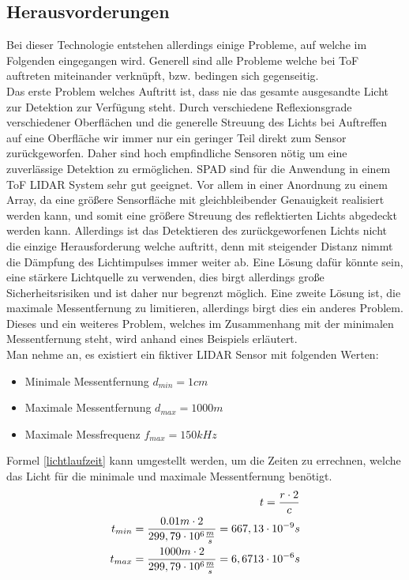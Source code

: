 \subsection{Herausvorderungen}\label{subsec:tof_herausvorderungen}
Bei dieser Technologie entstehen allerdings einige Probleme, auf welche im Folgenden eingegangen wird. Generell sind alle Probleme welche bei \ac{ToF} auftreten miteinander verknüpft, bzw. bedingen sich gegenseitig. \\
Das erste Problem welches Auftritt ist, dass nie das gesamte ausgesandte Licht zur Detektion zur Verfügung steht. Durch verschiedene Reflexionsgrade verschiedener Oberflächen und die generelle Streuung des Lichts bei Auftreffen auf eine Oberfläche wir immer nur ein geringer Teil direkt zum Sensor zurückgeworfen. Daher sind hoch empfindliche Sensoren nötig um eine zuverlässige Detektion zu ermöglichen.
\ac{SPAD} sind für die Anwendung in einem \ac{ToF} \ac{LIDAR} System sehr gut geeignet. Vor allem in einer Anordnung zu einem Array, da eine größere Sensorfläche mit gleichbleibender Genauigkeit realisiert werden kann, und somit eine größere Streuung des reflektierten Lichts abgedeckt werden kann. Allerdings ist das Detektieren des zurückgeworfenen Lichts nicht die einzige Herausforderung welche auftritt, denn mit steigender Distanz nimmt die Dämpfung des Lichtimpulses immer weiter ab. 
Eine Lösung dafür könnte sein, eine stärkere Lichtquelle zu verwenden, dies birgt allerdings große Sicherheitsrisiken und ist daher nur begrenzt möglich. Eine zweite Lösung ist, die maximale Messentfernung zu limitieren, allerdings birgt dies ein anderes Problem. Dieses und ein weiteres Problem, welches im Zusammenhang mit der minimalen Messentfernung steht, wird anhand eines Beispiels erläutert.\\
Man nehme an, es existiert ein fiktiver \ac{LIDAR} Sensor mit folgenden Werten:
\begin{itemize}
	\item Minimale Messentfernung $d_{min}=1 cm$
	\item Maximale Messentfernung $d_{max}=1000 m$
	\item Maximale Messfrequenz $f_{max}=150 kHz$ 
\end{itemize}
Formel \ref{lichtlaufzeit} kann umgestellt werden, um die Zeiten zu errechnen, welche das Licht für die minimale und maximale Messentfernung benötigt. 
\begin{equation}\formelentry{Berechnung der minimalen und maximalen Zeit}
	\begin{split}
		t = \frac{r \cdot 2}{c}\\
		t_{min} = \frac{0.01 m \cdot 2}{299,79 \cdot 10^6 \frac{m}{s}} = 667,13 \cdot 10^{-9}s\\
		t_{max} = \frac{1000 m \cdot 2}{299,79 \cdot 10^6 \frac{m}{s}} = 6,6713 \cdot 10^{-6}s\\
	\end{split}
\end{equation} 
